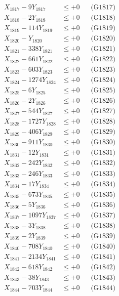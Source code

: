 \documentclass[a4paper,10pt]{article}
\begin{document}
{\begin{align}
X_{1817} - 9Y_{1817} &\leq +0 && \text{(G1817)} \\
X_{1818} - 2Y_{1818} &\leq +0 && \text{(G1818)} \\
X_{1819} - 114Y_{1819} &\leq +0 && \text{(G1819)} \\
X_{1820} - Y_{1820} &\leq +0 && \text{(G1820)} \\
\allowbreak
X_{1821} - 338Y_{1821} &\leq +0 && \text{(G1821)} \\
X_{1822} - 661Y_{1822} &\leq +0 && \text{(G1822)} \\
X_{1823} - 603Y_{1823} &\leq +0 && \text{(G1823)} \\
X_{1824} - 1274Y_{1824} &\leq +0 && \text{(G1824)} \\
X_{1825} - 6Y_{1825} &\leq +0 && \text{(G1825)} \\
X_{1826} - 2Y_{1826} &\leq +0 && \text{(G1826)} \\
X_{1827} - 544Y_{1827} &\leq +0 && \text{(G1827)} \\
X_{1828} - 1727Y_{1828} &\leq +0 && \text{(G1828)} \\
X_{1829} - 406Y_{1829} &\leq +0 && \text{(G1829)} \\
X_{1830} - 911Y_{1830} &\leq +0 && \text{(G1830)} \\
\allowbreak
X_{1831} - 12Y_{1831} &\leq +0 && \text{(G1831)} \\
X_{1832} - 242Y_{1832} &\leq +0 && \text{(G1832)} \\
X_{1833} - 246Y_{1833} &\leq +0 && \text{(G1833)} \\
X_{1834} - 17Y_{1834} &\leq +0 && \text{(G1834)} \\
X_{1835} - 673Y_{1835} &\leq +0 && \text{(G1835)} \\
X_{1836} - 5Y_{1836} &\leq +0 && \text{(G1836)} \\
X_{1837} - 1097Y_{1837} &\leq +0 && \text{(G1837)} \\
X_{1838} - 3Y_{1838} &\leq +0 && \text{(G1838)} \\
X_{1839} - 2Y_{1839} &\leq +0 && \text{(G1839)} \\
X_{1840} - 708Y_{1840} &\leq +0 && \text{(G1840)} \\
\allowbreak
X_{1841} - 2134Y_{1841} &\leq +0 && \text{(G1841)} \\
X_{1842} - 618Y_{1842} &\leq +0 && \text{(G1842)} \\
X_{1843} - 38Y_{1843} &\leq +0 && \text{(G1843)} \\
X_{1844} - 703Y_{1844} &\leq +0 && \text{(G1844)} \\

\end{align}}
\end{document}
